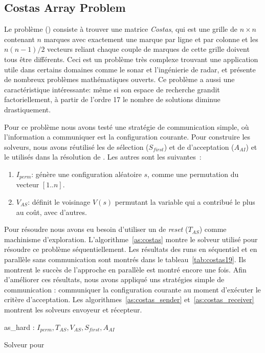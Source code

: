 \subsection{Costas Array Problem}

Le problème \carr{} (\CARRP) consiste à trouver une matrice {\it Costas}, qui est une grille de $n \times n$ contenant $n$ marques avec exactement une marque par ligne et par colonne et les $n(n-1)/2 $ vecteurs reliant chaque couple de marques de cette grille doivent tous être différents. Ceci est un problème très complexe trouvant une application utile dans certains domaines comme le sonar et l'ingénierie de radar, et présente de nombreux problèmes mathématiques ouverts. Ce problème a aussi une caractéristique intéressante: même si son espace de recherche grandit factoriellement, à partir de l'ordre 17 le nombre de solutions diminue drastiquement.

Pour ce problème nous avons testé une stratégie de communication simple, où l'information a communiquer est la configuration courante. Pour construire les solveurs, nous avons réutilisé les \oms{} de sélection ($S_{first}$) et de d'acceptation ($A_{AI}$) et le \opch{} utilisés dans la résolution de \SGP{}. Les autres \oms{} sont les suivantes~:

\begin{enumerate}
	\item $I_{perm}$: génère une configuration aléatoire $s$, comme une permutation du vecteur $[1..n]$. 
	\item $V_{AS}$: définit le voisinage $V \left(s\right)$ permutant la variable qui a contribué le plus au coût, avec d'autres.
\end{enumerate}

Pour résoudre \CARRP{} nous avons eu besoin d'utiliser un \om{} de \textit{reset} ($T_{AS}$) comme machinisme d'exploration. L'algorithme~\ref{as:costas} montre le solveur utilisé pour résoudre ce problème séquentiellement. Les résultats des runs en séquentiel et en parallèle sans communication sont montrés dans le tableau~\ref{tab:costas19}. Ils montrent le succès de l'approche en parallèle est montré encore une fois. Afin d'améliorer ces résultats, nous avons appliqué uns stratégies   simple de communication : communiquer la configuration courante au moment d'exécuter le critère d'acceptation. Les algorithmes~\ref{as:costas_sender} et~\ref{as:costas_receiver} montrent les solveurs envoyeur et récepteur.

\begin{algorithm}[!h]
\dontprintsemicolon
\SetNoline
{}
   as\_hard\;
\algoindent{} : $I_{perm}, T_{AS}, V_{AS}, S_{first}, A_{AI}$ \;
\caption{Solveur pour \CARRP}\label{as:costas}
\end{algorithm}

